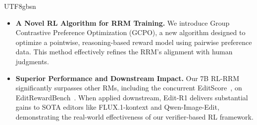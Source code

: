 \documentclass{llmxive}
\begin{document}
\begin{CJK*}{UTF8}{gbsn}
\begin{itemize}[leftmargin=*]
    \item \textbf{A Novel RL Algorithm for RRM Training.} We introduce Group Contrastive Preference Optimization (GCPO), a new algorithm designed to optimize a pointwise, reasoning-based reward model using pairwise preference data. This method effectively refines the RRM's alignment with human judgments.
    
    \item \textbf{Superior Performance and Downstream Impact.} Our 7B RL-RRM significantly surpasses other RMs, including the concurrent EditScore~\citep{luo2025editscore}, on EditRewardBench~\citep{luo2025editscore}. When applied downstream, Edit-R1 delivers substantial gains to SOTA editors like FLUX.1-kontext and Qwen-Image-Edit, demonstrating the real-world effectiveness of our verifier-based RL framework.
\end{itemize}


\end{CJK*}
\end{document}
